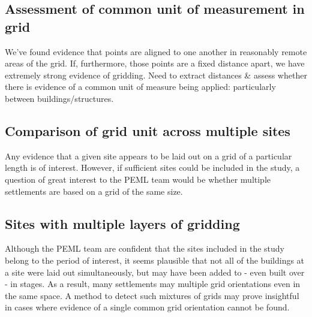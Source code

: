 \documentclass[../../ArchStats.tex]{subfiles}
\begin{document}
\subsection{Assessment of common unit of measurement in grid}
We've found evidence that points are aligned to one another in reasonably remote areas of the grid. If, furthermore, those points are a fixed distance apart, we have extremely strong evidence of gridding. Need to extract distances \& assess whether there is evidence of a common unit of measure being applied: particularly between buildings/structures.


\subsection{Comparison of grid unit across multiple sites}
Any evidence that a given site appears to be laid out on a grid of a particular length is of interest. However, if sufficient sites could be included in the study, a question of great interest to the PEML team would be whether multiple settlements are based on a grid of the same size.

\subsection{Sites with multiple layers of gridding}
Although the PEML team are confident that the sites included in the study belong to the period of interest, it seems plausible that not all of the buildings at a site were laid out simultaneously, but may have been added to - even built over - in stages. As a result, many settlements may multiple grid orientations even in the same space. A method to detect such mixtures of grids may prove insightful in cases where evidence of a single common grid orientation cannot be found.



\end{document}
